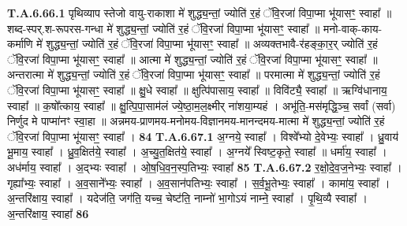 \documentclass[17pt]{extarticle}
\begin{document}
                  \newline
                                                         \textbf{} \newline \newline
                                \textbf{ T.A.6.66.1} \newline
                  पृथिव्याप स्तेजो वायु-राकाशा मे॑ शुद्ध्य॒न्तां॒  ज्योति॑ र॒हं ॅवि॒रजा॑ विपा॒प्मा भू॑यासꣳ॒॒ स्वाहा᳚ ॥  शब्द-स्पर्.श-रूपरस-गन्धा मे॑ शुद्ध्य॒न्तां॒  ज्योति॑ र॒हं ॅवि॒रजा॑ विपा॒प्मा भू॑यासꣳ॒॒ स्वाहा᳚ ॥  मनो-वाक्-काय-कर्माणि मे॑ शुद्ध्य॒न्तां॒  ज्योति॑ र॒हं ॅवि॒रजा॑ विपा॒प्मा भू॑यासꣳ॒॒ स्वाहा᳚ ॥  अव्यक्तभावै-र॑हङ्का॒र॒र् ज्योति॑ र॒हं ॅवि॒रजा॑ विपा॒प्मा भू॑यासꣳ॒॒ स्वाहा᳚ ॥  आत्मा मे॑ शुद्ध्य॒न्तां॒ ज्योति॑ र॒हं ॅवि॒रजा॑ विपा॒प्मा भू॑यासꣳ॒॒ स्वाहा᳚ ॥  अन्तरात्मा मे॑ शुद्ध्य॒न्तां॒ ज्योति॑ र॒हं ॅवि॒रजा॑ विपा॒प्मा भू॑यासꣳ॒॒ स्वाहा᳚ ॥  परमात्मा मे॑ शुद्ध्य॒न्तां॒ ज्योति॑ र॒हं ॅवि॒रजा॑ विपा॒प्मा भू॑यासꣳ॒॒ स्वाहा᳚ ॥  क्षु॒धे स्वाहा᳚ ॥ क्षुत्पि॑पासाय॒ स्वाहा᳚ ॥  विवि॑ट्यै॒ स्वाहा᳚ ॥ ऋग्वि॑धानाय॒ स्वाहा᳚ ॥ क॒षो᳚त्काय॒ स्वाहा᳚ ॥  क्षु॒त्पि॒पा॒साम॑लं ज्ये॒ष्ठा॒म॒ल॒क्ष्मीर् ना॑शया॒म्यहं ।  अभू॑ति॒-मस॑मृद्धि॒ञ्च॒ सर्वां (सर्वा) निर्णुद मे पाप्मा॑नꣳ स्वा॒हा ॥  अन्नमय-प्राणमय-मनोमय-विज्ञानमय-मानन्दमय-मात्मा मे॑ शुद्ध्य॒न्तां॒ ज्योति॑ र॒हं ॅवि॒रजा॑ विपा॒प्मा भू॑यासꣳ॒॒ स्वाहा᳚ । \textbf{ 84} \newline
                  \newline
                                                         \textbf{} \newline \newline
                                \textbf{ T.A.6.67.1} \newline
                  अ॒ग्नये॒ स्वाहा᳚ । विश्वे᳚भ्यो दे॒वेभ्यः॒ स्वाहा᳚ । ध्रु॒वाय॑ भू॒माय॒ स्वाहा᳚ । ध्रु॒व॒क्षित॑ये॒ स्वाहा᳚ । अ॒च्यु॒त॒क्षित॑ये॒ स्वाहा᳚ । अ॒ग्नये᳚ स्विष्ट॒कृते॒ स्वाहा᳚ ॥ धर्मा॑य॒ स्वाहा᳚ । अध॑र्माय॒ स्वाहा᳚ । अ॒द्भ्यः स्वाहा᳚ । ओ॒ष॒धि॒व॒न॒स्प॒तिभ्यः॒ स्वाहा᳚ \textbf{ 85} \newline
                  \newline
                                                                  \textbf{ T.A.6.67.2} \newline
                  र॒क्षो॒दे॒व॒ज॒नेभ्यः॒ स्वाहा᳚ ।  गृह्या᳚भ्यः॒ स्वाहा᳚ । अ॒व॒साने᳚भ्यः॒ स्वाहा᳚ । अ॒व॒सान॑पतिभ्यः॒ स्वाहा᳚ ।  स॒र्व॒भू॒तेभ्यः॒ स्वाहा᳚ । कामा॑य॒ स्वाहा᳚ । अ॒न्तरि॑क्षाय॒ स्वाहा᳚ । यदेज॑ति॒ जग॑ति॒ यच्च॒ चेष्ट॑ति॒ नाम्नो॑ भा॒गोऽयं नाम्ने॒ स्वाहा᳚ ।  पृ॒थि॒व्यै स्वाहा᳚ । अ॒न्तरि॑क्षाय॒ स्वाहा᳚ \textbf{ 86} \newline
\end{document}
